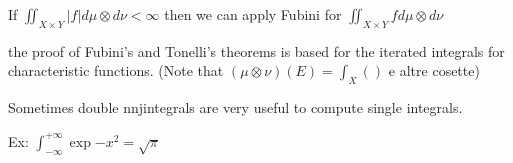 If \(\iint_{X \times Y} \vert f \vert d\mu \otimes d\nu < \infty\) then we can apply Fubini for \(\iint_{X \times Y} f d\mu \otimes d\nu\)
\begin{remark}
    the proof of Fubini's and Tonelli's theorems is based for the iterated integrals for characteristic functions.
    (Note that \((\mu \otimes \nu)(E) = \int_X ()\) e altre cosette)
\end{remark}
\begin{remark}
    Sometimes double nnjintegrals are very useful to compute single integrals.
\end{remark}
Ex: \(\int_{-\infty}^{+\infty}\exp{-x^2} = \sqrt{\pi}\)



